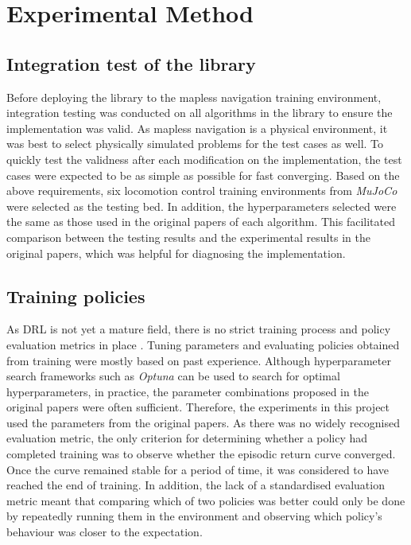 \newpage
\section{Experimental Method} \label{sec:method}

\subsection{Integration test of the library}

Before deploying the library to the mapless navigation training environment, integration testing was conducted on all algorithms in the library to ensure the implementation was valid. As mapless navigation is a physical environment, it was best to select physically simulated problems for the test cases as well. To quickly test the validness after each modification on the implementation, the test cases were expected to be as simple as possible for fast converging. Based on the above requirements, six locomotion control training environments from \textit{MuJoCo} were selected as the testing bed. In addition, the hyperparameters selected were the same as those used in the original papers of each algorithm. This facilitated comparison between the testing results and the experimental results in the original papers, which was helpful for diagnosing the implementation.

\subsection{Training policies}

As DRL is not yet a mature field, there is no strict training process and policy evaluation metrics in place \cite{ref:drl-that-matters}. Tuning parameters and evaluating policies obtained from training were mostly based on past experience. Although hyperparameter search frameworks such as \textit{Optuna} can be used to search for optimal hyperparameters, in practice, the parameter combinations proposed in the original papers were often sufficient. Therefore, the experiments in this project used the parameters from the original papers. As there was no widely recognised evaluation metric, the only criterion for determining whether a policy had completed training was to observe whether the episodic return curve converged. Once the curve remained stable for a period of time, it was considered to have reached the end of training. In addition, the lack of a standardised evaluation metric meant that comparing which of two policies was better could only be done by repeatedly running them in the environment and observing which policy's behaviour was closer to the expectation.

